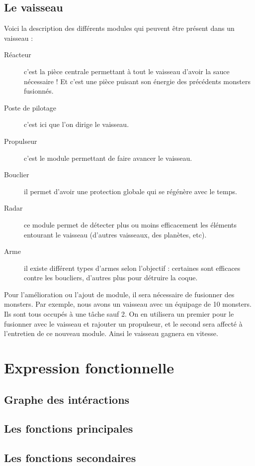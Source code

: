 \documentclass[a4paper,11pt]{report}
\begin{document}
    \section{Le vaisseau}
      Voici la description des différents modules qui peuvent être présent dans un vaisseau :
      \begin{description}
        \item[Réacteur] c'est la pièce centrale permettant à tout le vaisseau d'avoir la sauce nécessaire ! Et c'est une pièce puisant son énergie des précédents monsters fusionnés.
        \item[Poste de pilotage] c'est ici que l'on dirige le vaisseau.
        \item[Propulseur] c'est le module permettant de faire avancer le vaisseau.
        \item[Bouclier] il permet d'avoir une protection globale qui se régénère avec le temps.
        \item[Radar] ce module permet de détecter plus ou moins efficacement les éléments entourant le vaisseau (d'autres vaisseaux, des planètes, etc).
        \item[Arme] il existe différent types d'armes selon l'objectif : certaines sont efficaces contre les boucliers, d'autres plus pour détruire la coque.
      \end{description}
      Pour l'amélioration ou l'ajout de module, il sera nécessaire de fusionner des monsters. Par exemple, nous avons un vaisseau avec un équipage de 10 monsters. Ils sont tous occupés à une tâche sauf 2. On en utilisera un premier pour le fusionner avec le vaisseau et rajouter un propulseur, et le second sera affecté à l'entretien de ce nouveau module. Ainsi le vaisseau gagnera en vitesse.

\chapter{Expression fonctionnelle}
    \section{Graphe des intéractions}

    \section{Les fonctions principales}

    \section{Les fonctions secondaires}
\end{document}
